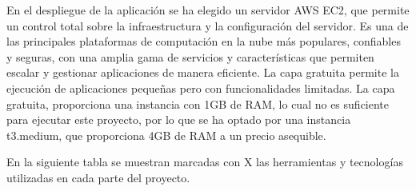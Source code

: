 En el despliegue de la aplicación se ha elegido un servidor AWS EC2, que permite un control total sobre la infraestructura y la configuración del servidor. Es una de las principales plataformas de computación en la nube más populares, confiables y seguras, con una amplia gama de servicios y características que permiten escalar y gestionar aplicaciones de manera eficiente. La capa gratuita permite la ejecución de aplicaciones pequeñas pero con funcionalidades limitadas. La capa gratuita, proporciona una instancia con 1GB de RAM, lo cual no es suficiente para ejecutar este proyecto, por lo que se ha optado por una instancia t3.medium, que proporciona 4GB de RAM a un precio asequible.

En la siguiente tabla se muestran marcadas con X las herramientas y tecnologías utilizadas en cada parte del proyecto. 

